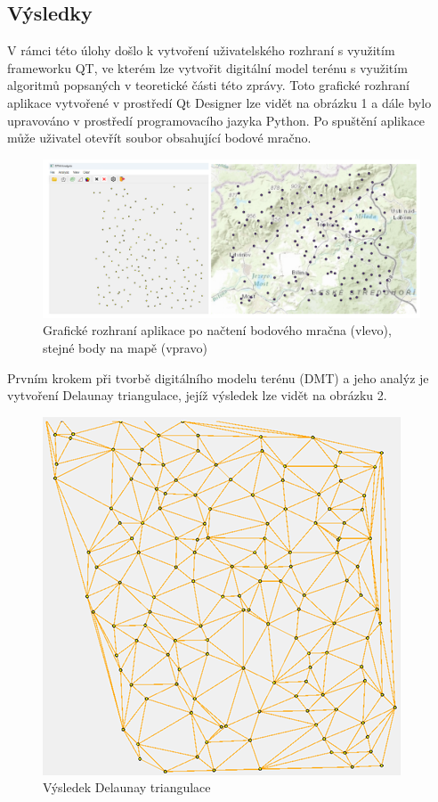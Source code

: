 \documentclass{article}
\begin{document}
\begin{spacing}{1.5}
\section{Výsledky}
V rámci této úlohy došlo k vytvoření uživatelského rozhraní s využitím frameworku QT, ve kterém lze vytvořit digitální model terénu s využitím algoritmů popsaných v teoretické části této zprávy. Toto grafické rozhraní aplikace vytvořené v prostředí Qt Designer lze vidět na obrázku 1 a dále bylo upravováno v prostředí programovacího jazyka Python. Po spuštění aplikace může uživatel otevřít soubor obsahující bodové mračno.

\begin{figure}[h]
    \centering
    \includegraphics[width=0.9\linewidth]{images/01rozhrani.png}
    \caption{Grafické rozhraní aplikace po načtení bodového mračna (vlevo), stejné body na mapě (vpravo)}
    \label{fig:enter-label}
\end{figure}

Prvním krokem při tvorbě digitálního modelu terénu (DMT) a jeho analýz je vytvoření Delaunay triangulace, jejíž výsledek lze vidět na obrázku 2.

\begin{figure}[h]
    \centering
    \includegraphics[width=0.4\linewidth]{images/02triangulace.png}
    \caption{Výsledek Delaunay triangulace}
    \label{fig:enter-label}
\end{figure}


\end{spacing}
\end{document}
